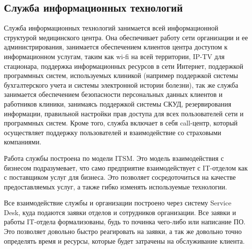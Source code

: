\subsection{Служба информационных технологий} \label{sec:ITSRV}
Служба информационных технологий занимается всей информационной структурой медицинского центра. Она обеспечивает работу сети организации и ее администрирования, занимается обеспечением клиентов центра доступом к информационном услугам, таким как wi-fi на всей территории, IP-TV для стационара, поддержка информационных ресурсов в сети Интернет, поддержкой программных систем, используемых клиникой (например поддержкой системы бухгалтерского учета и системы электронной истории болезни), так же служба занимается обеспечением безопасности персональных данных клиентов и работников клиники, занимаясь поддержкой системы СКУД, резервирования информации, правильной настройки прав доступа для всех пользователей сети и программных систем. Кроме того, служба включает в себя call-центр, который осуществляет поддержку пользователей и взаимодействие со страховыми компаниями.

Работа службы построена по модели ITSM. Это модель взаимодействия с бизнесом подразумевает, что само предприятие взаимодействует с IT-отделом как с поставщиком услуг для бизнеса. Это позволяет сосредоточиться на качестве предоставляемых услуг, а также гибко изменять используемые технологии. 

Все взаимодействие службы и организации построено через систему Service Desk, куда подаются заявки отделов и сотрудников организации. Все заявки и работы IT-отдела формализованы, будь то починка чего-либо или написание ПО. Это позволяет довольно быстро реагировать на заявки, а так же довольно точно определять время и ресурсы, которые будет затрачены на обслуживание клиента.